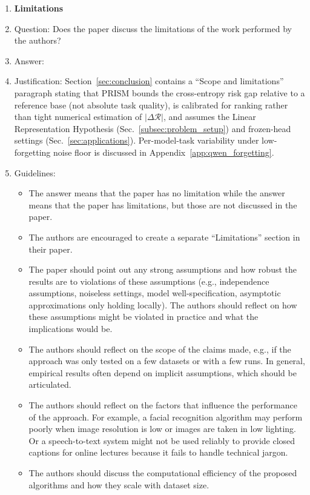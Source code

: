 \begin{enumerate}
\item {\bf Limitations}
    \item[] Question: Does the paper discuss the limitations of the work performed by the authors?
    \item[] Answer: \answerYes{}
    \item[] Justification: Section~\ref{sec:conclusion} contains a ``Scope and limitations'' paragraph stating that PRISM bounds the cross-entropy risk gap relative to a reference base (not absolute task quality), is calibrated for ranking rather than tight numerical estimation of $|\Delta\mathcal{R}|$, and assumes the Linear Representation Hypothesis (Sec.~\ref{subsec:problem_setup}) and frozen-head settings (Sec.~\ref{sec:applications}). Per-model-task variability under low-forgetting noise floor is discussed in Appendix~\ref{app:qwen_forgetting}.
    \item[] Guidelines:
    \begin{itemize}
        \item The answer \answerNA{} means that the paper has no limitation while the answer \answerNo{} means that the paper has limitations, but those are not discussed in the paper.
        \item The authors are encouraged to create a separate ``Limitations'' section in their paper.
        \item The paper should point out any strong assumptions and how robust the results are to violations of these assumptions (e.g., independence assumptions, noiseless settings, model well-specification, asymptotic approximations only holding locally). The authors should reflect on how these assumptions might be violated in practice and what the implications would be.
        \item The authors should reflect on the scope of the claims made, e.g., if the approach was only tested on a few datasets or with a few runs. In general, empirical results often depend on implicit assumptions, which should be articulated.
        \item The authors should reflect on the factors that influence the performance of the approach. For example, a facial recognition algorithm may perform poorly when image resolution is low or images are taken in low lighting. Or a speech-to-text system might not be used reliably to provide closed captions for online lectures because it fails to handle technical jargon.
        \item The authors should discuss the computational efficiency of the proposed algorithms and how they scale with dataset size.

\end{itemize}
\end{enumerate}
